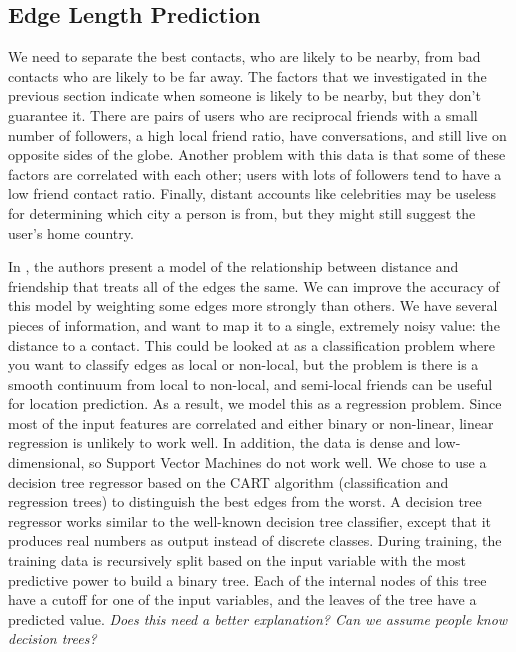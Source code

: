 \documentclass[letterpaper]{article}
\newcommand{\jam}[1]{\emph{#1}}
\newcommand{\flsec}[1]{\subsection{#1}}
\begin{document}
\flsec{Edge Length Prediction}

We need to separate the best contacts, who are likely to be nearby, from
bad contacts who are likely to be far away.
%
The factors that we investigated in the previous section indicate when someone
is likely to be nearby, but they don't guarantee it.
%
There are pairs of users who are reciprocal friends with a small number of
followers, a high local friend ratio, have conversations, and still live on
opposite sides of the globe.
%
Another problem with this data is that some of these factors are correlated
with each other; users with lots of followers tend to have a low friend contact
ratio.
%
Finally, distant accounts like celebrities may be useless for determining which
city a person is from, but they might still suggest the user's home country.

In \cite{backstrom2010find}, the authors present a model of the relationship
between distance and friendship that treats all of the edges the same.
%
We can improve the accuracy of this model by weighting some edges more strongly
than others.
%
We have several pieces of information, and want to map it to a single, extremely
noisy value: the distance to a contact.
%
This could be looked at as a classification problem where you want to classify
edges as local or non-local, but the problem is there is a smooth continuum
from local to non-local, and semi-local friends can be useful for location
prediction.
%
As a result, we model this as a regression problem.
%
Since most of the input features are correlated and either binary or non-linear,
linear regression is unlikely to work well.
%
In addition, the data is dense and low-dimensional, so Support Vector Machines
do not work well.
%
We chose to use a decision tree regressor based on the CART algorithm
(classification and regression trees) to distinguish the best edges from the
worst.
%
A decision tree regressor works similar to the well-known decision tree
classifier, except that it produces real numbers as output instead of discrete
classes.
%
During training, the training data is recursively split based on the input
variable with the most predictive power to build a binary tree.
%
Each of the internal nodes of this tree have a cutoff for one of the input
variables, and the leaves of the tree have a predicted value.
%
\jam{Does this need a better explanation? Can we assume people know decision
trees?}
\end{document}
